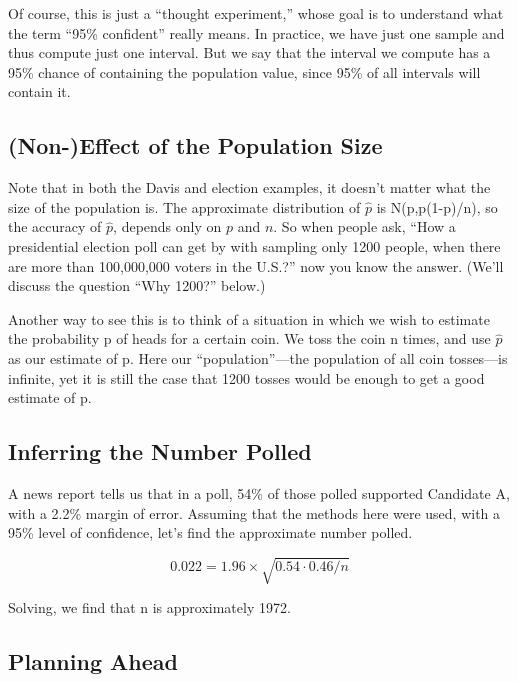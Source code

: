 Of course, this is just a ``thought experiment,'' whose goal is to
understand what the term ``95\% confident'' really means.  In practice,
we have just one sample and thus compute just one interval.  But we say
that the interval we compute has a 95\% chance of containing the
population value, since 95\% of all intervals will contain it. 


\subsection{(Non-)Effect of the Population Size}

Note that in both the Davis and election examples, it doesn't matter
what the size of the population is.  The approximate distribution of
$\widehat{p}$ is N(p,p(1-p)/n), so the accuracy of $\widehat{p}$, depends
only on $p$ and $n$.  So when people ask, ``How a presidential election
poll can get by with sampling only 1200 people, when there are more than
100,000,000 voters in the U.S.?'' now you know the answer.  (We'll
discuss the question ``Why 1200?'' below.)

Another way to see this is to think of a situation in which we wish to
estimate the probability p of heads for a certain coin.  We toss the
coin n times, and use $\widehat{p}$ as our estimate of p.  Here our
``population''---the population of all coin tosses---is infinite, yet it
is still the case that 1200 tosses would be enough to get a good
estimate of p.

\subsection{Inferring the Number Polled}

A news report tells us that in a poll, 54\% of those polled supported
Candidate A, with a 2.2\% margin of error.  Assuming that the methods
here were used, with a 95\% level of confidence, let's find the
approximate number polled.

\begin{equation}
0.022 = 1.96 \times \sqrt{0.54 \cdot 0.46 / n}
\end{equation}

Solving, we find that n is approximately 1972.

\subsection{Planning Ahead}

